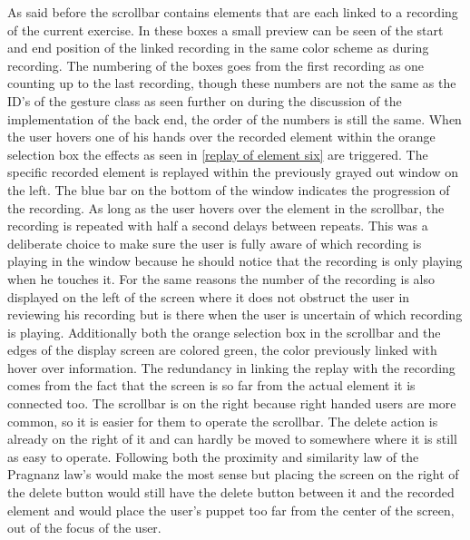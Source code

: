 As said before the scrollbar contains elements that are each linked to a recording of the current exercise. In these boxes a small preview can be seen of the start and end position of the linked recording in the same color scheme as during recording. The numbering of the boxes goes from the first recording as one counting up to the last recording, though these numbers are not the same as the ID's of the gesture class as seen further on during the discussion of the implementation of the back end, the order of the numbers is still the same. When the user hovers one of his hands over the recorded element within the orange selection box the effects as seen in \ref{replay of element six} are triggered. The specific recorded element is replayed within the previously grayed out window on the left. The blue bar on the bottom of the window indicates the progression of the recording. As long as the user hovers over the element in the scrollbar, the recording is repeated with half a second delays between repeats. This was a deliberate choice to make sure the user is fully aware of which recording is playing in the window because he should notice that the recording is only playing when he touches it. For the same reasons the number of the recording is also displayed on the left of the screen where it does not obstruct the user in reviewing his recording but is there when the user is uncertain of which recording is playing. Additionally both the orange selection box in the scrollbar and the edges of the display screen are colored green, the color previously linked with hover over information. The redundancy in linking the replay with the recording comes from the fact that the screen is so far from the actual element it is connected too. The scrollbar is on the right because right handed users are more common, so it is easier for them to operate the scrollbar. The delete action is already on the right of it and can hardly be moved to somewhere where it is still as easy to operate. Following both the proximity and similarity law of the Pragnanz law's would make the most sense but placing the screen on the right of the delete button would still have the delete button between it and the recorded element and would place the user's puppet too far from the center of the screen, out of the focus of the user.\\

